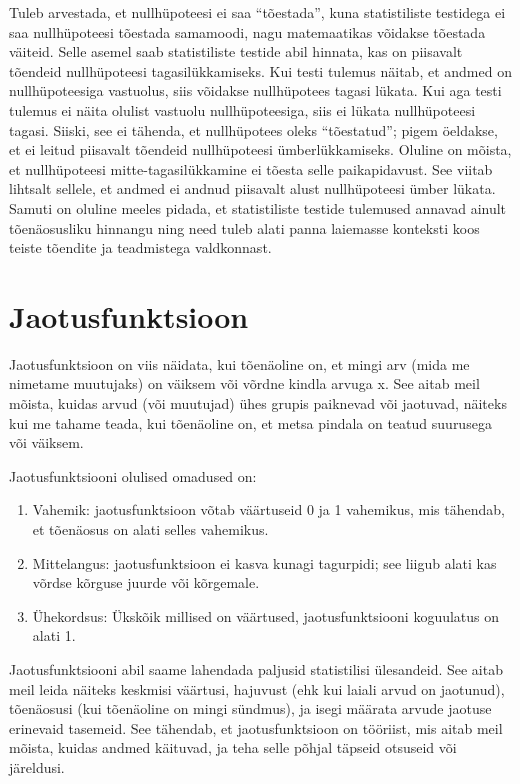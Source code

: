 \documentclass[
]{book}
\begin{document}
Tuleb arvestada, et nullhüpoteesi ei saa ``tõestada'', kuna statistiliste testidega ei saa nullhüpoteesi tõestada samamoodi, nagu matemaatikas võidakse tõestada väiteid. Selle asemel saab statistiliste testide abil hinnata, kas on piisavalt tõendeid nullhüpoteesi tagasilükkamiseks. Kui testi tulemus näitab, et andmed on nullhüpoteesiga vastuolus, siis võidakse nullhüpotees tagasi lükata. Kui aga testi tulemus ei näita olulist vastuolu nullhüpoteesiga, siis ei lükata nullhüpoteesi tagasi. Siiski, see ei tähenda, et nullhüpotees oleks ``tõestatud''; pigem öeldakse, et ei leitud piisavalt tõendeid nullhüpoteesi ümberlükkamiseks. Oluline on mõista, et nullhüpoteesi mitte-tagasilükkamine ei tõesta selle paikapidavust. See viitab lihtsalt sellele, et andmed ei andnud piisavalt alust nullhüpoteesi ümber lükata. Samuti on oluline meeles pidada, et statistiliste testide tulemused annavad ainult tõenäosusliku hinnangu ning need tuleb alati panna laiemasse konteksti koos teiste tõendite ja teadmistega valdkonnast.

\section{Jaotusfunktsioon}\label{jaotusfunktsioon}

Jaotusfunktsioon on viis näidata, kui tõenäoline on, et mingi arv (mida me nimetame muutujaks) on väiksem või võrdne kindla arvuga x. See aitab meil mõista, kuidas arvud (või muutujad) ühes grupis paiknevad või jaotuvad, näiteks kui me tahame teada, kui tõenäoline on, et metsa pindala on teatud suurusega või väiksem.

Jaotusfunktsiooni olulised omadused on:

\begin{enumerate}
\def\labelenumi{\arabic{enumi}.}
\item
  Vahemik: jaotusfunktsioon võtab väärtuseid 0 ja 1 vahemikus, mis tähendab, et tõenäosus on alati selles vahemikus.
\item
  Mittelangus: jaotusfunktsioon ei kasva kunagi tagurpidi; see liigub alati kas võrdse kõrguse juurde või kõrgemale.
\item
  Ühekordsus: Ükskõik millised on väärtused, jaotusfunktsiooni koguulatus on alati 1.
\end{enumerate}

Jaotusfunktsiooni abil saame lahendada paljusid statistilisi ülesandeid. See aitab meil leida näiteks keskmisi väärtusi, hajuvust (ehk kui laiali arvud on jaotunud), tõenäosusi (kui tõenäoline on mingi sündmus), ja isegi määrata arvude jaotuse erinevaid tasemeid. See tähendab, et jaotusfunktsioon on tööriist, mis aitab meil mõista, kuidas andmed käituvad, ja teha selle põhjal täpseid otsuseid või järeldusi.
\end{document}

